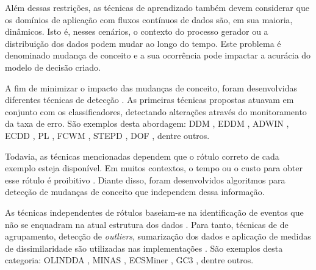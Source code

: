 \documentclass[qual, classic, a4paper]{ufbathesis}
\begin{document}
Além dessas restrições, as técnicas de aprendizado também devem considerar que os domínios de aplicação com fluxos contínuos de dados são, em sua maioria, dinâmicos.
Isto é, nesses cenários, o contexto do processo gerador ou a distribuição dos dados podem mudar ao longo do tempo.
Este problema é denominado mudança de conceito \cite{Gama:2010:KDD:1855075} e a sua ocorrência pode impactar a acurácia do modelo de decisão criado.

A fim de minimizar o impacto das mudanças de conceito, foram desenvolvidas diferentes técnicas de detecção \cite{Gama:2014:SCD:2597757.2523813}.
As primeiras técnicas propostas atuavam em conjunto com os classificadores, detectando alterações através do monitoramento da taxa de erro.
São exemplos desta abordagem: DDM \cite{GamaMCR04}, EDDM \cite{EDDM},  
ADWIN \cite{BifetG07}, ECDD \cite{Ross:2012:EWM:2076039.2076307}, 
PL \cite{Bach:PL:2008}, FCWM \cite{FCWM}, STEPD \cite{STEPD}, DOF \cite{Sobhani:2011:NDD:2045295.2045309}, dentre outros.


Todavia, as técnicas mencionadas dependem que o rótulo correto de cada exemplo esteja disponível.
Em muitos contextos, o tempo ou o custo para obter esse rótulo é proibitivo \cite{Aggarwal:2006:DSM:1196418}.
Diante disso, foram desenvolvidos algoritmos para detecção de mudanças de conceito que independem dessa informação.

As técnicas independentes de rótulos baseiam-se na identificação de eventos que não se enquadram na atual estrutura dos dados \cite{Spinosa:2007:OCA:1244002.1244107}.
Para tanto, técnicas de de agrupamento, detecção de \textit{outliers}, sumarização dos dados e aplicação de medidas de dissimilaridade são utilizadas nas implementações \cite{Ryu:Kantardzic:2012}.
São exemplos desta categoria:
OLINDDA \cite{Spinosa:2007:OCA:1244002.1244107},
MINAS \cite{Faria:2013:NDA:2480362.2480515},
ECSMiner \cite{Masud:2011:CNC:1978259.1978529},
GC3 \cite{Sethi2016b:GC3}, dentre outros.
\end{document}
